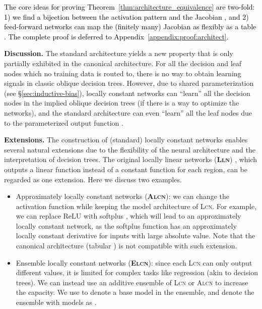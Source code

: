 \documentclass{article} \usepackage{iclr2020_conference,times}
\newcommand{\textcyan}[1]{\textcolor{black}{#1}}
\newcommand{\xref}[1]{\S\ref{#1}}
\begin{document}
\textcyan{The core ideas for proving Theorem~\ref{thm:architecture_equivalence} are two-fold: 1) we find a bijection between the activation pattern  and the Jacobian , and 2) feed-forward networks  can map the (finitely many) Jacobian  as flexibly as a table . The complete proof is deferred to Appendix~\ref{appendix:proof:architect}.}





















\textbf{Discussion.} The standard architecture yields a new property that is only partially exhibited in the canonical architecture. For all the decision and leaf nodes which no training data is routed to, there is no way to obtain learning signals in classic oblique decision trees. However, due to shared parameterization (see \xref{sec:inductive-bias}), locally constant networks can ``learn'' all the decision nodes in the implied oblique decision trees (if there is a way to optimize the networks), and the standard architecture can even ``learn'' all the leaf nodes due to the parameterized output function .


\textbf{Extensions.} The construction of (standard) locally constant networks enables several natural extensions due to the flexibility of the neural architecture and the interpretation of decision trees. The original locally linear networks (\textbf{\textsc{Lln}}) , which outputs a linear function instead of a constant function for each region, can be regarded as one extension. Here we discuss two examples.
\begin{itemize}[leftmargin=4mm]
\vspace{-2mm}
    \item {Approximately locally constant networks (\textbf{\textsc{Alcn}})}: we can change the activation function while keeping the model architecture of \textsc{Lcn}. For example, we can replace ReLU  with softplus , which will lead to an approximately locally constant network, as the softplus function has an approximately locally constant derivative for inputs with large absolute value. Note that the canonical architecture (tabular ) is not compatible with such extension. 
\vspace{-1mm}
    \item Ensemble locally constant networks (\textbf{\textsc{Elcn}}): since each \textsc{Lcn} can only output  different values, it is limited for complex tasks like regression (akin to decision trees). We can instead use an additive ensemble of \textsc{Lcn} or \textsc{Alcn} to increase the capacity. We use  to denote a base model in the ensemble, and denote the ensemble with  models as . 
\vspace{-2mm}
\end{itemize}
 \vspace{-1mm}
\end{document}
